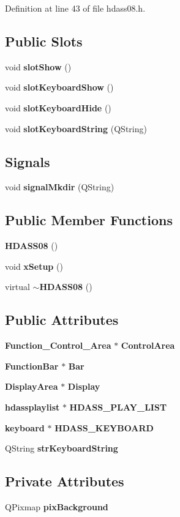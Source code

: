 Definition at line 43 of file hdass08.h.\subsection*{Public Slots}
\begin{CompactItemize}
\item 
void {\bf slot\-Show} ()
\item 
void {\bf slot\-Keyboard\-Show} ()
\item 
void {\bf slot\-Keyboard\-Hide} ()
\item 
void {\bf slot\-Keyboard\-String} (QString)
\end{CompactItemize}
\subsection*{Signals}
\begin{CompactItemize}
\item 
void {\bf signal\-Mkdir} (QString)
\end{CompactItemize}
\subsection*{Public Member Functions}
\begin{CompactItemize}
\item 
{\bf HDASS08} ()
\item 
void {\bf x\-Setup} ()
\item 
virtual {\bf $\sim$HDASS08} ()
\end{CompactItemize}
\subsection*{Public Attributes}
\begin{CompactItemize}
\item 
{\bf Function\_\-Control\_\-Area} $\ast$ {\bf Control\-Area}
\item 
{\bf Function\-Bar} $\ast$ {\bf Bar}
\item 
{\bf Display\-Area} $\ast$ {\bf Display}
\item 
{\bf hdassplaylist} $\ast$ {\bf HDASS\_\-PLAY\_\-LIST}
\item 
{\bf keyboard} $\ast$ {\bf HDASS\_\-KEYBOARD}
\item 
QString {\bf str\-Keyboard\-String}
\end{CompactItemize}
\subsection*{Private Attributes}
\begin{CompactItemize}
\item 
QPixmap {\bf pix\-Background}
\end{CompactItemize}


